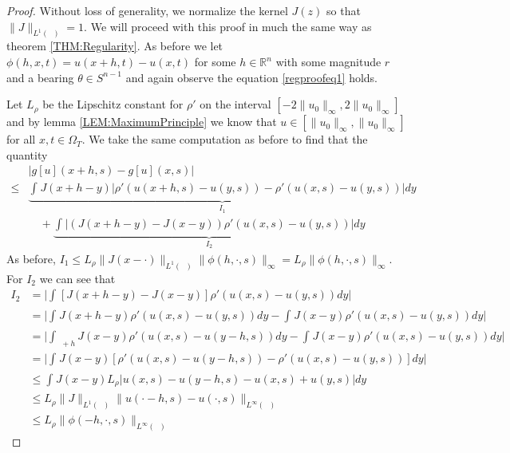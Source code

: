 \documentclass[aps,
preprint,
groupedaddress,
showkeys,
amsmath]{revtex4-2}
\DeclareMathOperator{\Rn}{\mathbb{R}^n}
\begin{document}
    \begin{proof}
        Without loss of generality, we normalize the kernel $J(z)$ so that $\|J\|_{L^{1}(\Rn)}=1$.
        We will proceed with this proof in much the same way as theorem \ref{THM:Regularity}. As before we let $\phi(h,x,t) = u(x+h,t)-u(x,t)$ for some $h\in \mathbb{R}^n$ with some magnitude $r$ and a bearing $\theta \in S^{n-1}$ and again observe the equation \eqref{regproofeq1} holds. 

        Let $L_\rho$ be the Lipschitz constant for $\rho'$ on the interval $[-2\|u_0\|_\infty, 2\|u_0\|_\infty]$ and by lemma \ref{LEM:MaximumPrinciple} we know that $u\in [\|u_0\|_\infty, \|u_0\|_\infty]$ for all $x,t\in \Omega_T$. We take the same computation as before to find that the quantity 
        \begin{equation*}
            \begin{split}
               &|g[u](x+h,s)-g[u](x,s)|\\ \leq &\underbrace{\int_{\Rn} J(x+h-y)|\rho'(u(x+h,s)-u(y,s))-\rho'(u(x,s)-u(y,s))|dy}_{I_1}\\
                & \quad +\underbrace{\int_{\Rn} |(J(x+h-y)-J(x-y))\rho'(u(x,s)-u(y,s))|dy}_{I_2} 
            \end{split}
        \end{equation*}
        As before, $I_1\leq L_\rho\|J(x-\cdot)\|_{L^1(\Rn)}\|\phi(h,\cdot,s)\|_\infty =L_\rho\|\phi(h,\cdot, s)\|_\infty$. For $I_2$ we can see that
        \begin{equation*}
            \begin{split}
                I_2&=\bigg|\int_{\Rn} [J(x+h-y)-J(x-y)]\rho'(u(x,s)-u(y,s))dy\bigg|\\
                &=\bigg|\int_{\Rn} J(x+h-y)\rho'(u(x,s)-u(y,s))dy-\int_{\Rn} J(x-y)\rho'(u(x,s)-u(y,s))dy\bigg|\\
                &=\bigg|\int_{\Rn+h} J(x-y)\rho'(u(x,s)-u(y-h,s))dy-\int_{\Rn} J(x-y)\rho'(u(x,s)-u(y,s))dy\bigg|\\
                &=\bigg|\int_{\Rn} J(x-y)[\rho'(u(x,s)-u(y-h,s))-\rho'(u(x,s)-u(y,s))]dy\bigg|\\
                &\leq \int_{\Rn} J(x-y)L_\rho\big|u(x,s)-u(y-h,s)-u(x,s)+u(y,s)|dy\\
                &\leq L_\rho\|J\|_{L^1(\Rn)}\|u(\cdot -h,s)-u(\cdot, s)\|_{L^\infty(\Rn)}\\
                &\leq L_\rho \|\phi(-h,\cdot,s)\|_{L^\infty(\Rn)}
            \end{split}
        \end{equation*}


\end{proof}
\end{document}
